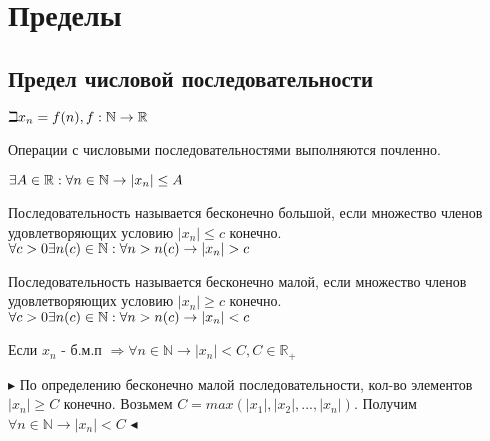 \documentclass[14pt]{extreport}
\begin{document}
\chapter{Пределы}
        \section{Предел числовой последовательности}
            \begin{definition}
                
                $\\\beth x_n = f(n), f:\mathbb{N} \rightarrow \mathbb{R}$
            \end{definition}

            Операции с числовыми последовательностями выполняются почленно. 
        
                \begin{definition}
                    $\\ \exists A \in \mathbb{R} : \forall n \in \mathbb{N} \rightarrow |x_n| \leq A$
                \end{definition}


                \begin{definition}
                    Последовательность называется бесконечно большой, если множество членов удовлетворяющих условию $|x_n| \leq c$ конечно.
                    $\\ \forall c > 0 \exists n(c) \in \mathbb{N} : \forall n > n(c) \rightarrow |x_n| > c$
                \end{definition}
                
                \begin{definition}
                    Последовательность называется бесконечно малой, если множество членов удовлетворяющих условию $|x_n| \geq c$ конечно.
                    $\\ \forall c > 0 \exists n(c) \in \mathbb{N} : \forall n > n(c) \rightarrow |x_n| < c$
                \end{definition}

                \begin{theorem}
                    Если ${x_n}$ - б.м.п $\Rightarrow \forall n \in \mathbb{N} \rightarrow |x_n| < C, C \in \mathbb{R}_+$
                \end{theorem}
                $\blacktriangleright$
                    По определению бесконечно малой последовательности, кол-во элементов $|x_n| \geq C$ конечно. Возьмем $C = max(|x_1|, |x_2|, ... , |x_n|)$. Получим $\forall n \in \mathbb{N} \rightarrow |x_n| < C$
                $\blacktriangleleft$

        
\end{document}
